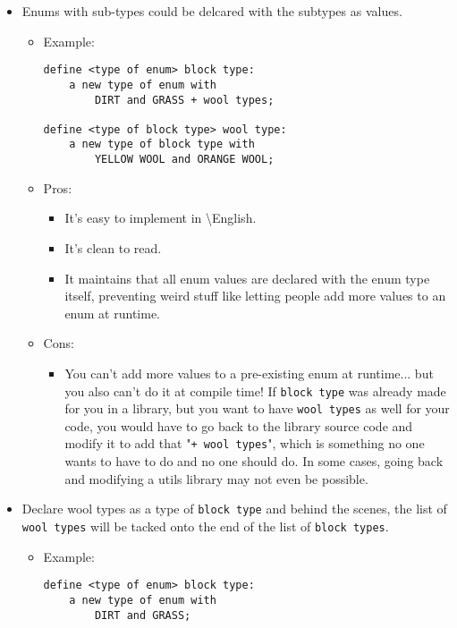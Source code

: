 \documentclass{article}
\newcommand{\name}{\textbackslash{}English}
\begin{document}
\begin{itemize}
	\item Enums with sub-types could be delcared with the subtypes as values.
	\begin{itemize}
		\item Example:\\
		\begin{lstlisting}
define <type of enum> block type:
	a new type of enum with 
		DIRT and GRASS + wool types;

define <type of block type> wool type:
	a new type of block type with
		YELLOW WOOL and ORANGE WOOL;
		\end{lstlisting}
		\item Pros:
		\begin{itemize}
			\item It's easy to implement in \name{}.
			\item It's clean to read.
			\item It maintains that all enum values are declared with the enum type itself, preventing weird stuff like letting people add more values to an enum at runtime.
		\end{itemize}
		\item Cons:
		\begin{itemize}
			\item You can't add more values to a pre-existing enum at runtime... but you also can't do it at compile time! If \texttt{block type} was already made for you in a library, but you want to have \texttt{wool types} as well for your code, you would have to go back to the library source code and modify it to add that "\texttt{+ wool types}", which is something no one wants to have to do and no one should do. In some cases, going back and modifying a utils library may not even be possible.
		\end{itemize}
	\end{itemize}
	\item Declare wool types as a type of \texttt{block type} and behind the scenes, the list of \texttt{wool types} will be tacked onto the end of the list of \texttt{block types}.
	\begin{itemize}
		\item Example:\\
		\begin{lstlisting}
define <type of enum> block type:
	a new type of enum with 
		DIRT and GRASS;


\end{lstlisting}
\end{itemize}
\end{itemize}
\end{document}
